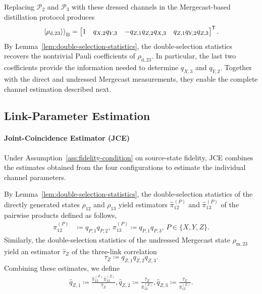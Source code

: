 Replacing \(\mathcal P_2\) and \(\mathcal P_3\) with these dressed
channels in the Mergecast-based distillation protocol produces
\begin{equation}
    \left. \left|\rho_{\text{d},23}\right\rangle \right \rangle_{\mathrm B}
    =
    \begin{bmatrix}
        1                      &
        q_{X,2}q_{Y,3}         &
        -q_{Z,1}q_{Z,2}q_{X,3} &
        q_{Z,1}q_{Y,2}q_{Z,3}
    \end{bmatrix}^{\mathsf T}.
    \label{eq:mergecast-dressed-state}
\end{equation}
By Lemma~\ref{lem:double-selection-statistics}, the double-selection
statistics  recovers the
nontrivial Pauli coefficients of \(\rho_{\text{d},23}\).
In particular, the last two coefficients provide the information
needed to determine \(q_{X,3}\) and \(q_{Y,2}\).
Together with the direct and undressed Mergecast measurements,
they enable the complete channel estimation described next.

\subsection{Link-Parameter Estimation}
\label{linkpa}
\paragraph{Joint-Coincidence Estimator (JCE)}
Under Assumption~\ref{ass:fidelity-condition} on source-state fidelity, JCE combines the estimates obtained from the four configurations
to estimate the individual channel parameters.


By Lemma~\ref{lem:double-selection-statistics}, the double-selection
statistics of the directly generated states $\rho_{12}$ and
$\rho_{13}$ yield estimators $\widehat{\pi}_{12}^{(P)}$ and
$\widehat{\pi}_{13}^{(P)}$ of the pairwise products defined as follows,
\begin{equation}
    \begin{aligned}
        \pi_{12}^{(P)}
         & \coloneqq q_{P,1}q_{P,2},\,
        \pi_{13}^{(P)}
        \coloneqq q_{P,1}q_{P,3},
        \, P\in\{X,Y,Z\}.
    \end{aligned}
    \label{eq:direct-correlations}
\end{equation}
Similarly, the double-selection statistics of the undressed
Mergecast state $\rho_{\text{m},23}$ yield an estimator
$\widehat{\tau}_Z$ of the three-link correlation
\[
    \tau_Z\coloneqq q_{Z,1}q_{Z,2}q_{Z,3}.
\]
Combining these estimates, we define
\begin{equation}
    \begin{aligned}
        \widehat{q}_{Z,1}
        \coloneqq
        \frac{\widehat{\pi}_{12}^{(Z)}
            \widehat{\pi}_{13}^{(Z)}}{\widehat{\tau}_Z},
        \widehat{q}_{Z,2}
        \coloneqq
        \frac{\widehat{\tau}_Z}{\widehat{\pi}_{13}^{(Z)}},
        \widehat{q}_{Z,3}
        \coloneqq
        \frac{\widehat{\tau}_Z}{\widehat{\pi}_{12}^{(Z)}}.
    \end{aligned}
    \label{eq:z-parameter-reconstruction}
\end{equation}

